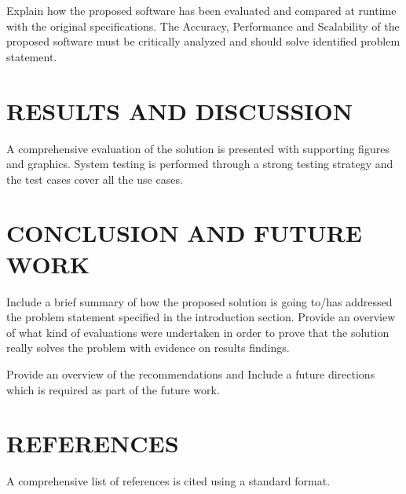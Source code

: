 \documentclass[12pt, a4paper]{report}
\begin{document}
Explain how the proposed software has been evaluated and compared at runtime with the original specifications. The Accuracy, Performance and Scalability of the proposed software must be critically analyzed and should solve identified problem statement. 
\chapter{RESULTS AND DISCUSSION}
A comprehensive evaluation of the solution is presented with supporting figures and graphics.
System testing is performed through a strong testing strategy and the test cases cover all the use cases. 

\chapter{CONCLUSION AND FUTURE WORK}
Include a brief summary of how the proposed solution is going to/has addressed the problem statement specified in the introduction section. Provide an overview of what kind of evaluations were undertaken in order to prove that the solution really solves the problem with evidence on results findings.

Provide an overview of the recommendations and Include a future directions which is required as part of the future work. 

\chapter{REFERENCES}
A comprehensive list of references is cited using a standard format.
\end{document}
